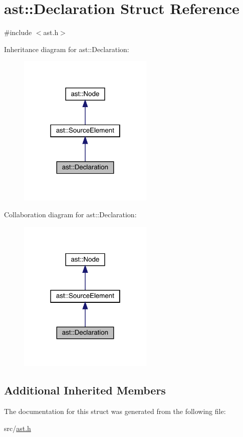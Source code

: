 \hypertarget{structast_1_1_declaration}{}\section{ast\+:\+:Declaration Struct Reference}
\label{structast_1_1_declaration}


{\ttfamily \#include $<$ast.\+h$>$}



Inheritance diagram for ast\+:\+:Declaration\+:
\nopagebreak
\begin{figure}[H]
\begin{center}
\leavevmode
\includegraphics[width=183pt]{structast_1_1_declaration__inherit__graph}
\end{center}
\end{figure}


Collaboration diagram for ast\+:\+:Declaration\+:
\nopagebreak
\begin{figure}[H]
\begin{center}
\leavevmode
\includegraphics[width=183pt]{structast_1_1_declaration__coll__graph}
\end{center}
\end{figure}
\subsection*{Additional Inherited Members}


The documentation for this struct was generated from the following file\+:\begin{DoxyCompactItemize}
\item 
src/\hyperlink{ast_8h}{ast.\+h}\end{DoxyCompactItemize}
